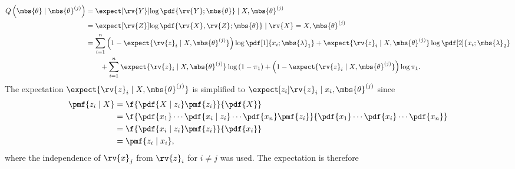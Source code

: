 \documentclass{tufte-handout}
\begin{document}
    \begin{align}
        Q\left(\mbs{\theta}\mid\mbs{\theta}^{(j)}\right) 
        &= \expect[\rv{Y}]{\log \pdf{\rv{Y} ; \mbs{\theta}} \mid X, \mbs{\theta}^{(j)}}\\
        &= \expect[\rv{Z}]{\log \pdf{\rv{X}, \rv{Z} ; \mbs{\theta}} \mid \rv{X}=X, \mbs{\theta}^{(j)}}\\
        &=
        \label{eq:Qtheta|thetaJ: split in params}
        \sum_{i=1}^{n} \left(1-\expect{\rv{z}_{i}\mid X, \mbs{\theta}^{(j)}}\right) \log \pdf[1]{{x}_{i}; \mbs{\lambda}_{1}} + \expect{\rv{z}_{i}\mid X, \mbs{\theta}^{(j)}}\log\pdf[2]{{x}_{i}; \mbs{\lambda}_{2}}
        \nonumber\\&\qquad
        +\sum_{i=1}^{n}\expect{\rv{z}_{i}\mid X, \mbs{\theta}^{(j)}}\log\left( 1-\pi_{1}\right) + \left(1-\expect{\rv{z}_{i}\mid X, \mbs{\theta}^{(j)}}\right)\log \pi_{1}.
    \end{align}
    The expectation $\expect{\rv{z}_{i} \mid X, \mbs{\theta}^{(j)}}$ is simplified to $\expect[z_{i}]{\rv{z}_{i} \mid x_{i}, \mbs{\theta}^{(j)}}$ 
    since
    \begin{align}
        \pmf{z_{i}\mid X} 
        &= \f{\pdf{X \mid z_{i}}\pmf{z_{i}}}{\pdf{X}}\\
        &= \f{\pdf{x_{1}}\cdots\pdf{x_{i}\mid z_{i}}\cdots \pdf{x_{n}} \pmf{z_{i}}}{\pdf{x_{1}}\cdots\pdf{x_{i}}\cdots\pdf{x_{n}}}\\
        &= \f{\pdf{x_{i}\mid z_{i}}\pmf{z_{i}}}{\pdf{x_{i}}}\\
        &= \pmf{z_{i}\mid x_{i}},
    \end{align}
    where the independence of $\rv{x}_{j}$ from $\rv{z}_{i}$ for $i\neq j$ was used.
    The expectation is therefore
\end{document}
